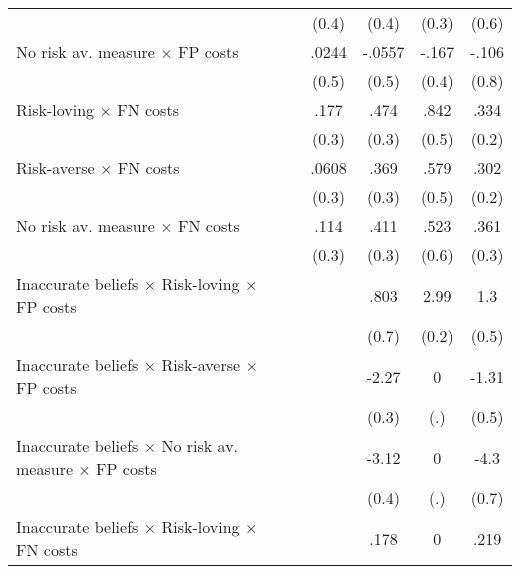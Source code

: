 \begin{table}[htbp]
\begin{tabular}{l*{5}{c}}
                &                  &    (0.4)         &    (0.4)         &    (0.3)         &    (0.6)         \\
No risk av. measure $\times$ FP costs&                  &    .0244         &   -.0557         &    -.167         &    -.106         \\
                &                  &    (0.5)         &    (0.5)         &    (0.4)         &    (0.8)         \\
Risk-loving $\times$ FN costs&                  &     .177         &     .474\sym{*}  &     .842\sym{*}  &     .334         \\
                &                  &    (0.3)         &    (0.3)         &    (0.5)         &    (0.2)         \\
Risk-averse $\times$ FN costs&                  &    .0608         &     .369         &     .579         &     .302         \\
                &                  &    (0.3)         &    (0.3)         &    (0.5)         &    (0.2)         \\
No risk av. measure $\times$ FN costs&                  &     .114         &     .411         &     .523         &     .361         \\
                &                  &    (0.3)         &    (0.3)         &    (0.6)         &    (0.3)         \\
Inaccurate beliefs $\times$ Risk-loving $\times$ FP costs&                  &                  &     .803         &     2.99\sym{***}&      1.3\sym{**} \\
                &                  &                  &    (0.7)         &    (0.2)         &    (0.5)         \\
Inaccurate beliefs $\times$ Risk-averse $\times$ FP costs&                  &                  &    -2.27\sym{***}&        0         &    -1.31\sym{***}\\
                &                  &                  &    (0.3)         &      (.)         &    (0.5)         \\
Inaccurate beliefs $\times$ No risk av. measure $\times$ FP costs&                  &                  &    -3.12\sym{***}&        0         &     -4.3\sym{***}\\
                &                  &                  &    (0.4)         &      (.)         &    (0.7)         \\
Inaccurate beliefs $\times$ Risk-loving $\times$ FN costs&                  &                  &     .178         &        0         &     .219         \\

\end{tabular}
\end{table}
